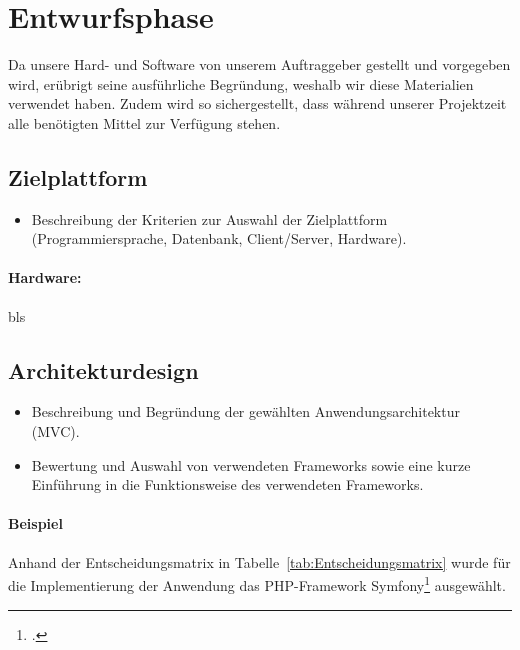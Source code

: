 \section{Entwurfsphase} 
\label{sec:Entwurfsphase}

Da unsere Hard- und Software von unserem Auftraggeber gestellt und vorgegeben wird, erübrigt seine ausführliche Begründung, weshalb wir diese Materialien verwendet haben. Zudem wird so sichergestellt, dass während unserer Projektzeit alle benötigten Mittel zur Verfügung stehen.

\subsection{Zielplattform}
\label{sec:Zielplattform}

\begin{itemize}
	\item Beschreibung der Kriterien zur Auswahl der Zielplattform (\ua Programmiersprache, Datenbank, Client/Server, Hardware).
\end{itemize}

\paragraph*{Hardware: }
bls

\subsection{Architekturdesign}
\label{sec:Architekturdesign}
\begin{itemize}
	\item Beschreibung und Begründung der gewählten Anwendungsarchitektur (\zB \acs{MVC}).
	\item \Ggfs Bewertung und Auswahl von verwendeten Frameworks sowie \ggfs eine kurze Einführung in die Funktionsweise des verwendeten Frameworks.
\end{itemize}

\paragraph{Beispiel}
Anhand der Entscheidungsmatrix in Tabelle~\ref{tab:Entscheidungsmatrix} wurde für die Implementierung der Anwendung das \acs{PHP}-Framework Symfony\footnote{\Vgl \citet{Symfony}.} ausgewählt. 



